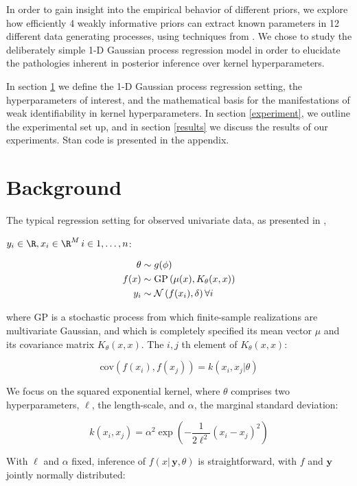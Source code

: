 \documentclass{article}
\newcommand{\lp}{\ensuremath{\left(}}
\newcommand{\rp}{\ensuremath{\right)}}
\begin{document}
In order to gain insight into the empirical behavior of different priors, we
explore how efficiently 4 weakly informative priors can extract known
parameters in 12 different data generating processes, using techniques from
\citet{cook2012validation}. We chose to study the deliberately simple 1-D
Gaussian process regression model in order to elucidate the pathologies
inherent in posterior inference over kernel hyperparameters.

In section \ref{background} we define the 1-D Gaussian process regression setting,
the hyperparameters of interest, and the mathematical basis for the manifestations
of weak identifiability in kernel hyperparameters. In section \ref{experiment}, we 
outline the experimental set up, and in section \ref{results} we discuss the results 
of our experiments. Stan code is presented in the appendix.

\section{Background} \label{background}

The typical regression setting for observed univariate data, as presented in \citet{flaxman2015fast},

$y_i \in \R, x_i \in \R^M\, i \in {1,\dots,n}$:

\begin{align*}
  \theta & \sim g(\phi) \\
  f(x) & \sim \text{GP}\lp \mu(x),
  K_\theta(x, x) \rp \\
  y_i & \sim \mathcal{N}\lp f(x_i), \delta \rp \forall i \\
\end{align*}

where $\text{GP}$ is a stochastic process from which finite-sample realizations are
multivariate Gaussian, and which is completely specified its mean vector $\mu$
and its covariance matrix $K_\theta(x, x)$. The $i, j$ th
element of $K_\theta(x, x)$:

\[
  \text{cov}(f(x_i), f(x_j)) = k(x_i, x_j | \theta) 
\]

We focus on the squared exponential kernel, where $\theta$ comprises
two hyperparameters, $\ell$, the length-scale, and $\alpha$, the marginal
standard deviation:

\[ \label{kern}
  k(x_i, x_j) = \alpha^2 
\exp \left(
	- \dfrac{1}{2\ell^2} (x_{i} - x_{j})^2
\right)
\]

With $\ell$ and $\alpha$ fixed, inference of $f(x | \, \mathbf{y}, \theta)$ is
straightforward, with $f$ and $\mathbf{y}$ jointly normally distributed:
\end{document}
